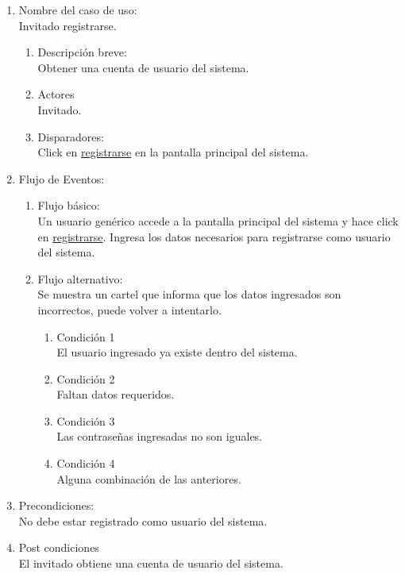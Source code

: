 \documentclass[a4paper,11pt]{article}
\begin{document}
\begin{enumerate}

	\item Nombre del caso de uso: \\
	Invitado registrarse.

	\begin{enumerate}
		\item Descripción breve: \\
			Obtener una cuenta de usuario del sistema.
		\item Actores \\
			Invitado.
	
		\item Disparadores: \\
			Click en \underline{registrarse} en la pantalla principal del sistema.

	\end{enumerate}

	\item Flujo de Eventos: \\

	\begin{enumerate}
		\item Flujo básico:\\
			Un usuario gen\'erico accede a la pantalla principal del sistema y
			hace click en \underline{registrarse}. Ingresa los datos necesarios
			para registrarse como usuario del sistema.

		\item Flujo alternativo:\\
			Se muestra un cartel que informa que los datos ingresados son
			incorrectos, puede volver a intentarlo.

			\begin{enumerate}
			\item Condición 1 \\
				El usuario ingresado ya existe dentro del sistema.
			\item Condición 2 \\
				Faltan datos requeridos.
			\item Condición 3 \\
				Las contrase\~nas ingresadas no son iguales.
			\item Condición 4 \\
				Alguna combinaci\'on de las anteriores.
			\end{enumerate}

	\end{enumerate}

	\item Precondiciones: \\
		No debe estar registrado como usuario del sistema.

	\item Post condiciones \\
		El invitado obtiene una cuenta de usuario del sistema.

\end{enumerate}
\end{document}
